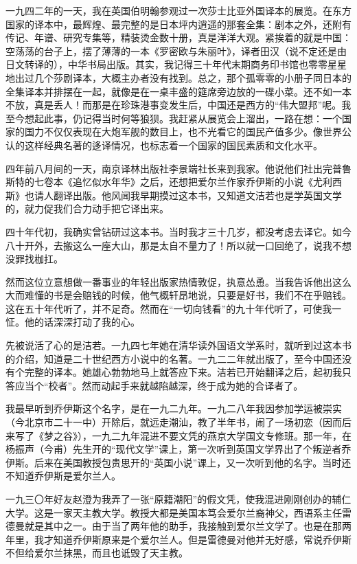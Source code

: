 \par 一九四二年的一天，我在英国伯明翰参观过一次莎士比亚外国译本的展览。在东方国家的译本中，最辉煌、最完整的是日本坪内逍遥的那套全集：剧本之外，还附有传记、年谱、研究专集等，精装烫金数十册，真是洋洋大观。紧挨着的就是中国：空荡荡的台子上，摆了薄薄的一本《罗密欧与朱丽叶》，译者田汉（说不定还是由日文转译的），中华书局出版。其实，我记得三十年代末期商务印书馆也零零星星地出过几个莎剧译本，大概主办者没有找到。总之，那个孤零零的小册子同日本的全集译本并排摆在一起，就像是在一桌丰盛的筵席旁边放的一碟小菜。还不如一本不放，真是丢人！而那是在珍珠港事变发生后，中国还是西方的“伟大盟邦”呢。我至今想起此事，仍记得当时何等狼狈。我赶紧从展览会上溜出，一路在想：一个国家的国力不仅仅表现在大炮军舰的数目上，也不光看它的国民产值多少。像世界公认的这样经典名著的迻译情况，也标志着一个国家的国民素质和文化水平。
\par 四年前八月间的一天，南京译林出版社李景端社长来到我家。他说他们社出完普鲁斯特的七卷本《追忆似水年华》之后，还想把爱尔兰作家乔伊斯的小说《尤利西斯》也请人翻译出版。他风闻我早期摸过这本书，又知道文洁若也是学英国文学的，就力促我们合力动手把它译出来。
\par 四十年代初，我确实曾钻研过这本书。当时我才三十几岁，都没考虑去译它。如今八十开外，去搬这么一座大山，那是太自不量力了！所以就一口回绝了，说我不想没罪找枷扛。
\par 然而这位立意想做一番事业的年轻出版家热情敦促，执意怂恿。当我告诉他出这么大而难懂的书是会赔钱的时候，他气概轩昂地说，只要是好书，我们不在乎赔钱。这在五十年代听了，并不足奇。然而在“一切向钱看”的九十年代听了，可使我一怔。他的话深深打动了我的心。
\par 先被说活了心的是洁若。一九四七年她在清华读外国语文学系时，就听到过这本书的介绍，知道是二十世纪西方小说中的名著。一九二二年就出版了，至今中国还没有个完整的译本。她雄心勃勃地马上就答应下来。洁若已开始翻译之后，起初我只答应当个“校者”。然而动起手来就越陷越深，终于成为她的合译者了。
\par 我最早听到乔伊斯这个名字，是在一九二九年。一九二八年我因参加学运被崇实（今北京市二十一中）开除后，就远走潮汕，教了半年书，闹了一场初恋（因而后来写了《梦之谷》），一九二九年混进不要文凭的燕京大学国文专修班。那一年，在杨振声（今甫）先生开的“现代文学”课上，第一次听到英国文学界出了个叛逆者乔伊斯。后来在美国教授包贵思开的“英国小说”课上，又一次听到他的名字。当时还不知道乔伊斯是爱尔兰人。
\par 一九三〇年好友赵澄为我弄了一张“原籍潮阳”的假文凭，使我混进刚刚创办的辅仁大学。这是一家天主教大学。教授大都是美国本笃会爱尔兰裔神父，西语系主任雷德曼就是其中之一。由于当了两年他的助手，我接触到爱尔兰文学了。也是在那两年里，我才知道乔伊斯原来是个爱尔兰人。但是雷德曼对他并无好感，常说乔伊斯不但给爱尔兰抹黑，而且也诋毁了天主教。
